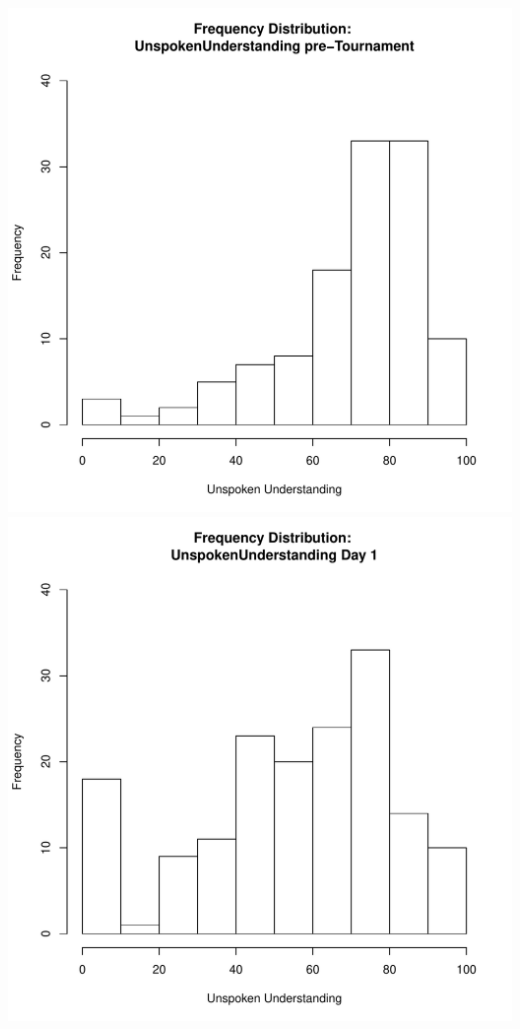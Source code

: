 \documentclass[12pt]{report}
\begin{document}
\clearpage
\includegraphics[scale =.4]{../images/distUnspokenUnderstandingPre.pdf}
\includegraphics[scale =.4]{../images/distUnspokenUnderstandingDay1.pdf}
\end{document}
